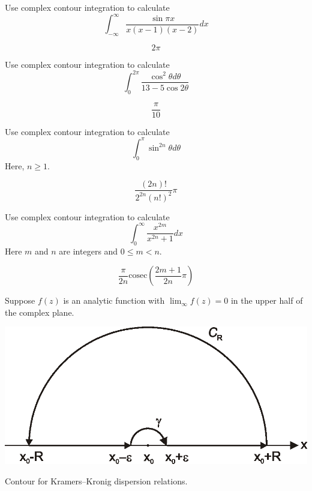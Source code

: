 \begin{exer}
Use complex contour integration to calculate
$$ \int_{-\infty}^{\infty} \frac{\sin \pi x}{x (x-1) (x-2)} dx$$
\begin{sol}
$$2 \pi$$
\end{sol}
\end{exer}

\begin{exer}
Use complex contour integration to calculate
$$ \int_0^{2\pi} \frac{\cos^2 \theta d \theta}{13-5\cos 2 \theta}$$
\begin{sol}
$$\frac{\pi}{10}$$
\end{sol}
\end{exer}

\begin{exer}
Use complex contour integration to calculate
$$ \int_0^\pi \sin^{2n} \theta d \theta$$
Here, $n \ge 1$.
\begin{sol}
$$\frac{(2n)!}{ 2^{2n}(n!)^2} \pi$$
\end{sol}
\end{exer}

\begin{exer}
Use complex contour integration to calculate
$$ \int_0^\infty \frac{x ^ {2m}}{x^{2n} + 1} dx$$
Here $m$ and $n$ are integers and $0 \le m < n$.
\begin{sol}
$$\frac{\pi}{2n} \mathrm{cosec} \left( \frac{2m+1}{2n} \pi \right)$$
\end{sol}
\end{exer}


\pagebreak




Suppose $f(z)$ is an analytic function with $\lim_\infty f(z) = 0$ in the upper half of the complex plane.

\begin{marginfigure}[-0.5cm]
\centering
\includegraphics{complex/figures/kk}
\caption{Contour for Kramers--Kronig dispersion relations.}
\label{fig-KK}
\end{marginfigure}

